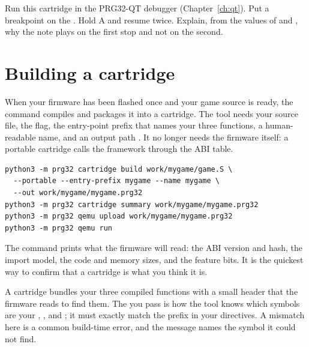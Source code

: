 

\begin{prgtry}
Run this cartridge in the PRG32-QT debugger (Chapter~\ref{ch:qt}). Put a
breakpoint on the . Hold A and resume twice. Explain, from the values
of  and , why the note plays on the first stop and not on the
second.
\end{prgtry}

\section{Building a cartridge}

When your firmware has been flashed once and your game source is ready, the
command  compiles and packages it into a
 cartridge. The tool needs your source file, the 
flag, the entry-point prefix that names your three functions, a human-readable
name, and an output path \citep{prg32tutorial}. It no longer needs the firmware
itself: a portable cartridge calls the framework through the ABI table.

\begin{lstlisting}[style=bash,caption={Building, inspecting, and running your assembly game.}]
python3 -m prg32 cartridge build work/mygame/game.S \
  --portable --entry-prefix mygame --name mygame \
  --out work/mygame/mygame.prg32
python3 -m prg32 cartridge summary work/mygame/mygame.prg32
python3 -m prg32 qemu upload work/mygame/mygame.prg32
python3 -m prg32 qemu run
\end{lstlisting}

The  command prints what the firmware will read: the ABI version
and hash, the import model, the code and memory sizes, and the feature bits. It
is the quickest way to confirm that a cartridge is what you think it is.

\begin{prgconcept}
A cartridge bundles your three compiled functions with a small header that the
firmware reads to find them. The  you pass is how the tool
knows which symbols are your \code{init}, \code{update}, and \code{draw}; it must
exactly match the prefix in your \code{.global} directives. A mismatch here is a
common build-time error, and the message names the symbol it could not find.
\end{prgconcept}

